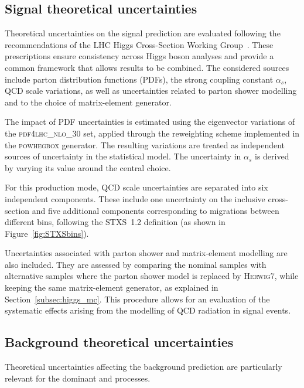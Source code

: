 \subsection{Signal theoretical uncertainties}
\label{subsec:signal_theo_syst}

Theoretical uncertainties on the \ttH signal prediction are evaluated following the recommendations of the LHC Higgs Cross-Section Working Group~\cite{https://doi.org/10.23731/cyrm-2017-002, https://doi.org/10.5170/cern-2013-004}. These prescriptions ensure consistency across Higgs boson analyses and provide a common framework that allows results to be combined. The considered sources include parton distribution functions (PDFs), the strong coupling constant $\alpha_{s}$, QCD scale variations, as well as uncertainties related to parton shower modelling and to the choice of matrix-element generator.  

The impact of PDF uncertainties is estimated using the eigenvector variations of the \textsc{pdf4lhc\_nlo\_30} set, applied through the reweighting scheme implemented in the \textsc{powhegbox} generator. The resulting variations are treated as independent sources of uncertainty in the statistical model. The uncertainty in $\alpha_{s}$ is derived by varying its value around the central choice. 

For this production mode, QCD scale uncertainties are separated into six independent components. These include one uncertainty on the inclusive cross-section and five additional components corresponding to migrations between different \pth bins, following the STXS~1.2 definition (as shown in Figure~\ref{fig:STXSbins}).

Uncertainties associated with parton shower and matrix-element modelling are also included. They are assessed by comparing the nominal samples with alternative samples where the parton shower model is replaced by \textsc{Herwig7}, while keeping the same matrix-element generator, as explained in Section~\ref{subsec:higgs_mc}. This procedure allows for an evaluation of the systematic effects arising from the modelling of QCD radiation in \ttH signal events.

\subsection{Background theoretical uncertainties}
\label{subsec:bkg_theo_syst}

Theoretical uncertainties affecting the background prediction are particularly relevant for the dominant \ztautau and \ttbar processes.  

